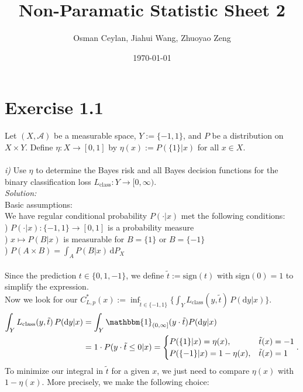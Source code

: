 \documentclass{article}
\title{Non-Paramatic Statistic Sheet 2}
\author{Osman Ceylan, Jiahui Wang, Zhuoyao Zeng}
\date{\today}
\begin{document}
\maketitle
\section*{Exercise 1.1}
Let $(X, \mathcal{A})$ be a measurable space, $Y := \{-1,1\}$, and $P$ be a distribution on $X \times Y$. Define $\eta: X \rightarrow [0,1]$ by $\eta(x) := P(\{1\}|x)$ for all $x \in X$.\\
 \\
\textsl{i)} Use $\eta$ to determine the Bayes risk and all Bayes decision functions for the binary classification loss $L_\text{class}:Y \rightarrow [0,\infty )$.\vspace{0.5em}\\
\textsl{Solution:} \\
Basic assumptions:\\
We have regular conditional probability $P(\cdot|x)$ met the following conditions:\\ 
) $P(\cdot|x):\{-1,1\} \rightarrow [0,1]$ is a probability measure \\
) $x \mapsto P(B|x)$ is measurable for $B = \{1\}$ or $B = \{-1\}$ \\
) $P(A \times B) = \displaystyle{ \int_{A} P(B|x)\, \text{d}P_X  }$\\
 \\
Since the prediction $t \in \{0,1,-1\}$, we define $\tilde{t}:= \text{sign}(t)$ with sign$(0) = 1$ to simplify the expression. \\
Now we look for our $C^*_{L,p}(x):= \inf_{\tilde{t}\in \{-1,1\}}\{\displaystyle{ \int_{Y} L_\text{class}(y,\tilde{t})\, P(\text{d}y|x)} \}$.  
\begin{align*}
\displaystyle{ \int_{Y} L_\text{class}(y,\tilde{t})\, P(\text{d}y|x) }
 & = \displaystyle{ \int_{Y} \mathbbm{1}_{(0,\infty]}(y\cdot\tilde{t}) P(\text{d}y|x)} \\
 & = 1 \cdot P(y\cdot\tilde{t} \leq 0 | x) =  \begin{cases} P(\{1\}|x) = \eta(x), &\tilde{t}(x) = -1 \cr  P(\{-1\}|x) = 1- \eta(x), &\tilde{t}(x) = 1 \end{cases}.
\end{align*}
To minimize our integral in $\tilde{t}$ for a given $x$, we just need to compare $\eta(x)$ with $1 - \eta(x)$. More precisely, we make the following choice:\\
\end{document}
